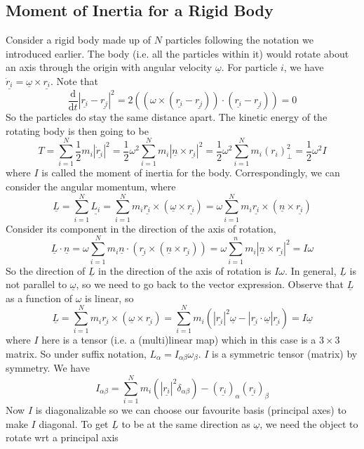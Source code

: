 \subsection{Moment of Inertia for a Rigid Body}
Consider a rigid body made up of $N$ particles following the notation we introduced earlier.
The body (i.e. all the particles within it) would rotate about an axis through the origin with angular velocity $\underline{\omega}$.
For particle $i$, we have $\underline{\dot{r}_i}=\underline{\omega}\times\underline{r_i}$.
Note that
$$\frac{\mathrm d}{\mathrm dt}|\underline{r_i}-\underline{r_j}|^2=2((\omega\times(\underline{r_i}-\underline{r_j}))\cdot(\underline{r_i}-\underline{r_j}))=0$$
So the particles do stay the same distance apart.
The kinetic energy of the rotating body is then going to be
$$T=\sum_{i=1}^N\frac{1}{2}m_i|\underline{\dot{r}_i}|^2=\frac{1}{2}\omega^2\sum_{i=1}^Nm_i|\underline{n}\times\underline{r_i}|^2=\frac{1}{2}\omega^2\sum_{i=1}^Nm_i(r_i)_\perp^2=\frac{1}{2}\omega^2I$$
where $I$ is called the moment of inertia for the body.
Correspondingly, we can consider the angular momentum, where
$$\underline{L}=\sum_{i=1}^N\underline{L_i}=\sum_{i=1}^Nm_i\underline{r_i}\times(\underline{\omega}\times\underline{r_i})=\omega\sum_{i=1}^Nm_i\underline{r_i}\times(\underline{n}\times\underline{r_i})$$
Consider its component in the direction of the axis of rotation,
$$\underline{L}\cdot\underline{n}=\omega\sum_{i=1}^Nm_i\underline{n}\cdot(\underline{r_i}\times(\underline{n}\times\underline{r_i}))=\omega\sum_{i=1}^nm_i|\underline{n}\times\underline{r_i}|^2=I\omega$$
So the direction of $\underline{L}$ in the direction of the axis of rotation is $I\omega$.
In general, $\underline{L}$ is not parallel to $\underline{\omega}$, so we need to go back to the vector expression.
Observe that $\underline{L}$ as a function of $\omega$ is linear, so
$$\underline{L}=\sum_{i=1}^Nm_i\underline{r_i}\times(\underline{\omega}\times\underline{r_i})=\sum_{i=1}^Nm_i(|\underline{r_i}|^2\underline{\omega}-|\underline{r_i}\cdot\underline{\omega}|\underline{r_i})=I\underline{\omega}$$
where $I$ here is a tensor (i.e. a (multi)linear map) which in this case is a $3\times 3$ matrix.
So under suffix notation, $L_\alpha=I_{\alpha\beta}\omega_\beta$.
$I$ is a symmetric tensor (matrix) by symmetry.
We have
$$I_{\alpha\beta}=\sum_{i=1}^Nm_i(|\underline{r_i}|^2\delta_{\alpha\beta})-(\underline{r_i})_\alpha(\underline{r_i})_\beta$$
Now $I$ is diagonalizable so we can choose our favourite basis (principal axes) to make $I$ diagonal.
To get $\underline{L}$ to be at the same direction as $\underline{\omega}$, we need the object to rotate wrt a principal axis
